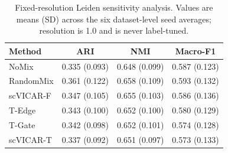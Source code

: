 \begin{table}[t]
\centering
\caption{Fixed-resolution Leiden sensitivity analysis. Values are means (SD) across the six dataset-level seed averages; resolution is 1.0 and is never label-tuned.}
\label{tab:leiden_overall}
\begin{tabular}{lccc}
\toprule
Method & ARI & NMI & Macro-F1 \\ 
\midrule
NoMix & 0.335 (0.093) & 0.648 (0.099) & 0.587 (0.123) \\
RandomMix & 0.361 (0.122) & 0.658 (0.109) & 0.593 (0.132) \\
scVICAR-F & 0.347 (0.105) & 0.655 (0.103) & 0.586 (0.136) \\
T-Edge & 0.343 (0.100) & 0.652 (0.100) & 0.580 (0.129) \\
T-Gate & 0.342 (0.098) & 0.652 (0.101) & 0.574 (0.128) \\
scVICAR-T & 0.337 (0.092) & 0.651 (0.097) & 0.573 (0.133) \\
\bottomrule
\end{tabular}
\end{table}

